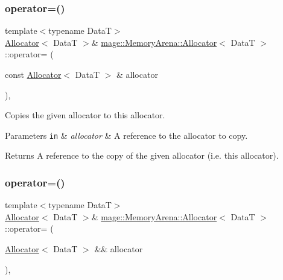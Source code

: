 \subsubsection{\texorpdfstring{operator=()}{operator=()}\hspace{0.1cm}{\footnotesize\ttfamily [1/2]}}
{\footnotesize\ttfamily template$<$typename DataT$>$ \\
\hyperlink{structmage_1_1_memory_arena_1_1_allocator}{Allocator}$<$ DataT $>$\& \hyperlink{structmage_1_1_memory_arena_1_1_allocator}{mage\+::\+Memory\+Arena\+::\+Allocator}$<$ DataT $>$\+::operator= (\begin{DoxyParamCaption}\item[{const \hyperlink{structmage_1_1_memory_arena_1_1_allocator}{Allocator}$<$ DataT $>$ \&}]{allocator }\end{DoxyParamCaption})\hspace{0.3cm}{\ttfamily [delete]}, {\ttfamily [noexcept]}}

Copies the given allocator to this allocator.


\begin{DoxyParams}[1]{Parameters}
\mbox{\tt in}  & {\em allocator} & A reference to the allocator to copy. \\
\hline
\end{DoxyParams}
\begin{DoxyReturn}{Returns}
A reference to the copy of the given allocator (i.\+e. this allocator). 
\end{DoxyReturn}
\hypertarget{structmage_1_1_memory_arena_1_1_allocator_a3211375e2861e7268cc84b3bf3421665}{}\label{structmage_1_1_memory_arena_1_1_allocator_a3211375e2861e7268cc84b3bf3421665} 
\subsubsection{\texorpdfstring{operator=()}{operator=()}\hspace{0.1cm}{\footnotesize\ttfamily [2/2]}}
{\footnotesize\ttfamily template$<$typename DataT$>$ \\
\hyperlink{structmage_1_1_memory_arena_1_1_allocator}{Allocator}$<$ DataT $>$\& \hyperlink{structmage_1_1_memory_arena_1_1_allocator}{mage\+::\+Memory\+Arena\+::\+Allocator}$<$ DataT $>$\+::operator= (\begin{DoxyParamCaption}\item[{\hyperlink{structmage_1_1_memory_arena_1_1_allocator}{Allocator}$<$ DataT $>$ \&\&}]{allocator }\end{DoxyParamCaption})\hspace{0.3cm}{\ttfamily [delete]}, {\ttfamily [noexcept]}}

